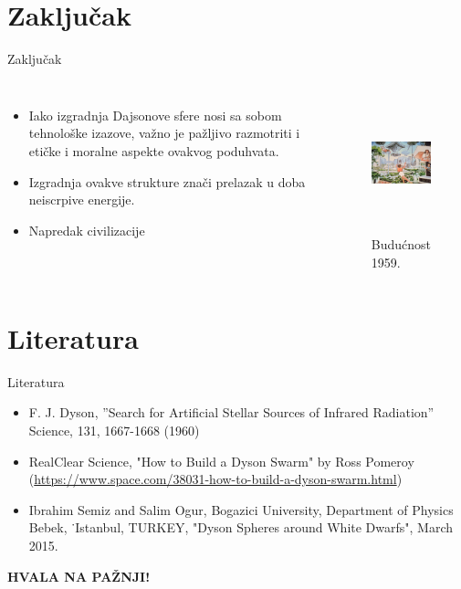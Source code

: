 \documentclass[13pt]{beamer}
\begin{document}
\section{Zaključak}

\begin{frame}{Zaključak}

\begin{columns}
        \begin{itemize}
            \item Iako izgradnja Dajsonove sfere nosi sa sobom tehnološke izazove, važno je pažljivo razmotriti i etičke i moralne aspekte ovakvog poduhvata.
            \item Izgradnja ovakve strukture znači prelazak u doba neiscrpive energije.
            \item Napredak civilizacije
        \end{itemize}
        \begin{figure}
            \centering
            \includegraphics[width=4.2cm, height=4cm]{images/buducnost.png}
            \caption{Budućnost 1959.}
        \end{figure}
\end{columns}

\end{frame}




\section{Literatura}

\begin{frame}{Literatura}

\begin{itemize}
    \item F. J. Dyson, ”Search for Artificial Stellar Sources of Infrared Radiation”
Science, 131, 1667-1668 (1960)
    \item RealClear Science, "How to Build a Dyson Swarm" by Ross Pomeroy
    (\url{https://www.space.com/38031-how-to-build-a-dyson-swarm.html})
    \item Ibrahim Semiz and Salim Ogur, Bogazici University, Department of Physics Bebek, ˙Istanbul, TURKEY, "Dyson Spheres around White Dwarfs", March 2015.
\end{itemize}

\end{frame}


\begin{frame}

\begin{center}
    \textbf{HVALA NA PAŽNJI!}
\end{center}

\end{frame}
\end{document}
